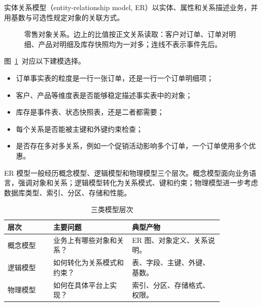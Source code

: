 实体关系模型（entity-relationship model, ER）以实体、属性和关系描述业务，并用基数与可选性规定对象的关联方式。

\begin{figure}[htbp]
\centering
{}
\caption{零售对象关系。边上的比值按正文关系读取：客户对订单、订单对明细、产品对明细及库存快照均为一对多；连线不表示事件先后。}
\label{fig:retail-er}
\end{figure}

图~\ref{fig:retail-er}~对应以下建模选择。
\begin{itemize}
  \item 订单事实表的粒度是一行一张订单，还是一行一个订单明细项；
  \item 客户、产品等维度表是否能够稳定描述事实表中的对象；
  \item 库存是事件表、状态快照表，还是二者都需要；
  \item 每个关系是否能被主键和外键约束检查；
  \item 是否存在多对多关系，例如一个促销活动影响多个订单，一个订单使用多个优惠。
\end{itemize}

ER 模型一般经历概念模型、逻辑模型和物理模型三个层次。概念模型面向业务语言，强调对象和关系；逻辑模型转化为关系模式、键和约束；物理模型进一步考虑数据库类型、索引、分区、存储和性能。

\begin{table}[htbp]
\centering
\caption{三类模型层次}
\begin{tabular}{P{0.18\linewidth}P{0.31\linewidth}P{0.36\linewidth}}
\toprule
{}
层次 & 主要问题 & 典型产物\\
\midrule
概念模型 & 业务上有哪些对象和关系？ & ER 图、对象定义、关系说明。\\
逻辑模型 & 如何转化为关系模式和约束？ & 表、字段、主键、外键、基数。\\
物理模型 & 如何在具体平台上实现？ & 索引、分区、存储格式、权限。\\
\bottomrule
\end{tabular}
\end{table}

